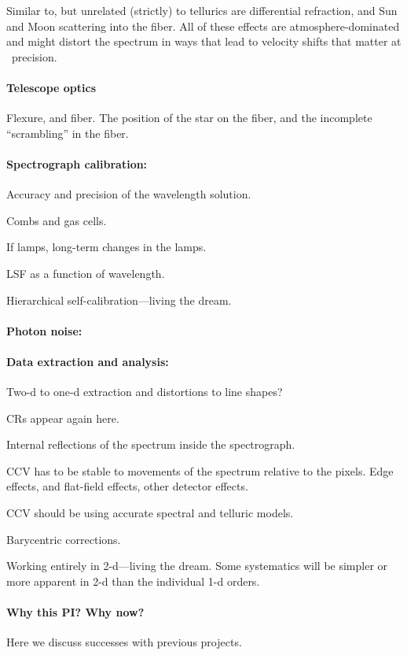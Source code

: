 \documentclass[12pt, fullpage, letterpaper]{article}
\begin{document}
Similar to, but unrelated (strictly) to tellurics are differential
refraction, and Sun and Moon scattering into the fiber.
All of these effects are atmosphere-dominated and might distort the spectrum
in ways that lead to velocity shifts that matter at \EPRV\ precision.

\paragraph{Telescope optics}
Flexure, and fiber. The position of the star on the fiber, and the
incomplete ``scrambling'' in the fiber.

\paragraph{Spectrograph calibration:}
Accuracy and precision of the wavelength solution.

Combs and gas cells.

If lamps, long-term changes in the lamps.

LSF as a function of wavelength.

Hierarchical self-calibration---living the dream.

\paragraph{Photon noise:}

\paragraph{Data extraction and analysis:}
Two-d to one-d extraction and distortions to line shapes?

CRs appear again here.

Internal reflections of the spectrum inside the spectrograph.

CCV has to be stable to movements of the spectrum relative to the
pixels. Edge effects, and flat-field effects, other detector effects.

CCV should be using accurate spectral and telluric models.

Barycentric corrections.

Working entirely in 2-d---living the dream. Some systematics will be
simpler or more apparent in 2-d than the individual 1-d orders.

\paragraph{Why this PI? Why now?}
Here we discuss successes with previous projects.
\end{document}
